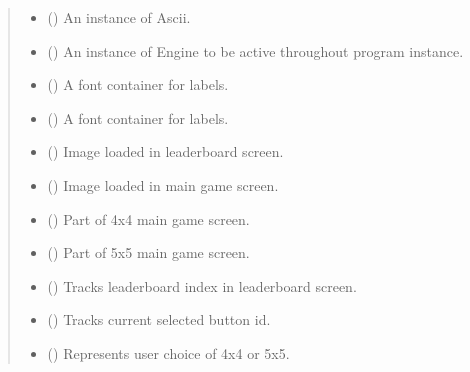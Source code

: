 \documentclass[letterpaper,10pt,english]{sphinxmanual}
\begin{document}
\begin{fulllineitems}
\begin{quote}
\begin{description}
\begin{itemize}
\item {} 
 () \textendash{} An instance of Ascii.

\item {} 
 () \textendash{} An instance of Engine to be active throughout program instance.

\item {} 
 () \textendash{} A font container for labels.

\item {} 
 () \textendash{} A font container for labels.

\item {} 
 () \textendash{} Image loaded in leaderboard screen.

\item {} 
 () \textendash{} Image loaded in main game screen.

\item {} 
 () \textendash{} Part of 4x4 main game screen.

\item {} 
 () \textendash{} Part of 5x5 main game screen.

\item {} 
 () \textendash{} Tracks leaderboard index in leaderboard screen.

\item {} 
 () \textendash{} Tracks current selected button id.

\item {} 
 () \textendash{} Represents user choice of 4x4 or 5x5.


\end{itemize}
\end{description}
\end{quote}
\end{fulllineitems}
\end{document}
